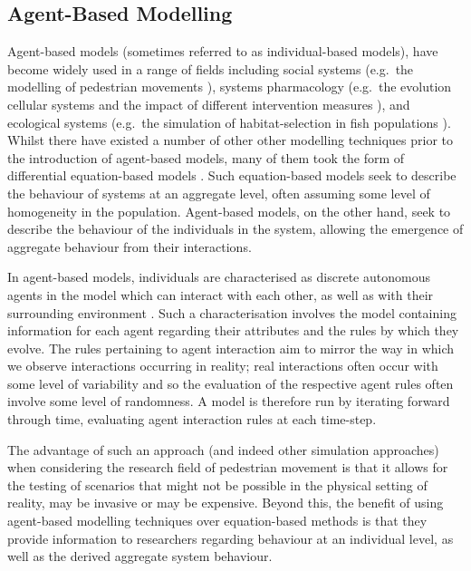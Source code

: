 \subsection{Agent-Based Modelling}\label{sub:abms}

Agent-based models (sometimes referred to as individual-based models), have
become widely used in a range of fields including social systems (e.g.\ the
modelling of pedestrian movements \citep{liu2014agent}), systems pharmacology
(e.g.\ the evolution cellular systems and the impact of different intervention
measures \citep{cosgrove2015agent}), and ecological systems (e.g.\ the simulation
of habitat-selection in fish populations \citep{railsback2002analysis}).
Whilst there have existed a number of other other modelling techniques prior to
the introduction of agent-based models, many of them took the form of
differential equation-based models \citep{parunak1998agent}.
Such equation-based models seek to describe the behaviour of systems at an
aggregate level, often assuming some level of homogeneity in the population. 
Agent-based models, on the other hand, seek to describe the behaviour of the
individuals in the system, allowing the emergence of aggregate behaviour from
their interactions.

In agent-based models, individuals are characterised as discrete autonomous
agents in the model which can interact with each other, as well as with their
surrounding environment \citep{bonabeau2002agent}.
Such a characterisation involves the model containing information for each agent
regarding their attributes and the rules by which they evolve.
The rules pertaining to agent interaction aim to mirror the way in which we
observe interactions occurring in reality; real interactions often occur with
some level of variability and so the evaluation of the respective agent rules
often involve some level of randomness.
A model is therefore run by iterating forward through time, evaluating agent
interaction rules at each time-step.

The advantage of such an approach (and indeed other simulation approaches) when
considering the research field of pedestrian movement is that it allows for the
testing of scenarios that might not be possible in the physical setting of
reality, may be invasive or may be expensive.
Beyond this, the benefit of using agent-based modelling techniques over
equation-based methods is that they provide information to researchers regarding
behaviour at an individual level, as well as the derived aggregate system
behaviour.

